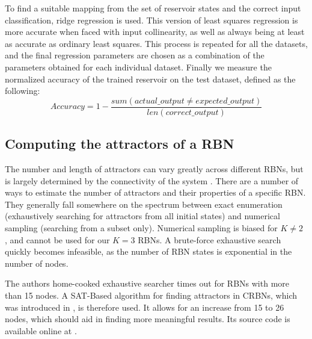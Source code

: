 To find a suitable mapping from the set of reservoir states and the correct input classification,
ridge regression \cite{hoerl1970ridge} is used.
This version of least squares regression is more accurate when faced with input collinearity, as well as always being at least as accurate as ordinary least squares.  
This process is repeated for all the datasets,
and the final regression parameters are chosen as a combination of the parameters obtained for each individual dataset.
Finally we measure the normalized accuracy of the trained reservoir on the test dataset,
defined as the following:
\begin{equation}
Accuracy = 1 - \dfrac{sum(actual\_output \neq expected\_output)}{len(correct\_output)}
\label{formula:accuracy}
\end{equation}

\subsection{Computing the attractors of a RBN}
\label{section:computing-attractors}

The number and length of attractors can vary greatly across different RBNs,
but is largely determined by the connectivity of the system \cite{gershenson2004introduction}.
There are a number of ways to estimate the number of attractors and their properties of a specific RBN.
They generally fall somewhere on the spectrum between exact enumeration (exhaustively searching for attractors from all initial states) and numerical sampling (searching from a subset only).
Numerical sampling is biased for $K\neq2$ \cite{berdahl2009random}, and cannot be used for our $K=3$ RBNs.
A brute-force exhaustive search quickly becomes infeasible, as the number of RBN states is exponential in the number of nodes.

The authors home-cooked exhaustive searcher times out for RBNs with more than 15 nodes.
A SAT-Based algorithm for finding attractors in CRBNs,
which was introduced in \cite{dubrova2011sat},
is therefore used.
It allows for an increase from 15 to 26 nodes,
which should aid in finding more meaningful results.
Its source code is available online at \cite{dubrova2011sat-online}.

